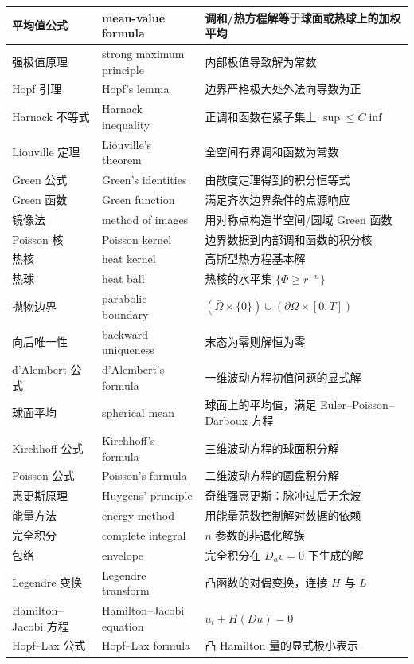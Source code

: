 \documentclass[UTF8,11pt,a4paper]{ctexart}
\begin{document}
\begin{longtable}{@{}>{\raggedright\arraybackslash}p{3.0cm}>{\raggedright\arraybackslash}p{5.0cm}>{\raggedright\arraybackslash}p{6.4cm}@{}}
\hline
平均值公式 & mean-value formula & 调和/热方程解等于球面或热球上的加权平均 \\
\hline
强极值原理 & strong maximum principle & 内部极值导致解为常数 \\
\hline
Hopf 引理 & Hopf's lemma & 边界严格极大处外法向导数为正 \\
\hline
Harnack 不等式 & Harnack inequality & 正调和函数在紧子集上 $\sup\le C\inf$ \\
\hline
Liouville 定理 & Liouville's theorem & 全空间有界调和函数为常数 \\
\hline
Green 公式 & Green's identities & 由散度定理得到的积分恒等式 \\
\hline
Green 函数 & Green function & 满足齐次边界条件的点源响应 \\
\hline
镜像法 & method of images & 用对称点构造半空间/圆域 Green 函数 \\
\hline
Poisson 核 & Poisson kernel & 边界数据到内部调和函数的积分核 \\
\hline
热核 & heat kernel & 高斯型热方程基本解 \\
\hline
热球 & heat ball & 热核的水平集 $\{\Phi\ge r^{-n}\}$ \\
\hline
抛物边界 & parabolic boundary & $(\bar\Omega\times\{0\})\cup(\partial\Omega\times[0,T])$ \\
\hline
向后唯一性 & backward uniqueness & 末态为零则解恒为零 \\
\hline
d'Alembert 公式 & d'Alembert's formula & 一维波动方程初值问题的显式解 \\
\hline
球面平均 & spherical mean & 球面上的平均值，满足 Euler--Poisson--Darboux 方程 \\
\hline
Kirchhoff 公式 & Kirchhoff's formula & 三维波动方程的球面积分解 \\
\hline
Poisson 公式 & Poisson's formula & 二维波动方程的圆盘积分解 \\
\hline
惠更斯原理 & Huygens' principle & 奇维强惠更斯：脉冲过后无余波 \\
\hline
能量方法 & energy method & 用能量范数控制解对数据的依赖 \\
\hline
完全积分 & complete integral & $n$ 参数的非退化解族 \\
\hline
包络 & envelope & 完全积分在 $D_av=0$ 下生成的解 \\
\hline
Legendre 变换 & Legendre transform & 凸函数的对偶变换，连接 $H$ 与 $L$ \\
\hline
Hamilton--Jacobi 方程 & Hamilton--Jacobi equation & $u_t+H(Du)=0$ \\
\hline
Hopf--Lax 公式 & Hopf--Lax formula & 凸 Hamilton 量的显式极小表示 \\

\end{longtable}
\end{document}
